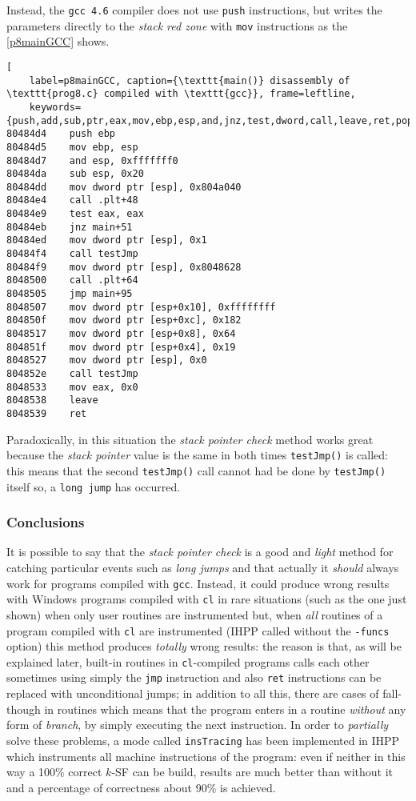 \documentclass[a4paper,10pt]{report}
\begin{document}
\noindent
Instead, the \verb|gcc 4.6| compiler does not use \verb|push| instructions, but
writes the parameters directly to the \emph{stack red zone}
with \verb|mov| instructions as the \cref{p8mainGCC} shows.

\begin{lstlisting}[
	label=p8mainGCC, caption={\texttt{main()} disassembly of \texttt{prog8.c} compiled with \texttt{gcc}}, frame=leftline,
	keywords={push,add,sub,ptr,eax,mov,ebp,esp,and,jnz,test,dword,call,leave,ret,pop,jmp}]
80484d4    push ebp
80484d5    mov ebp, esp
80484d7    and esp, 0xfffffff0
80484da    sub esp, 0x20
80484dd    mov dword ptr [esp], 0x804a040
80484e4    call .plt+48
80484e9    test eax, eax
80484eb    jnz main+51
80484ed    mov dword ptr [esp], 0x1
80484f4    call testJmp
80484f9    mov dword ptr [esp], 0x8048628
8048500    call .plt+64
8048505    jmp main+95
8048507    mov dword ptr [esp+0x10], 0xffffffff
804850f    mov dword ptr [esp+0xc], 0x182
8048517    mov dword ptr [esp+0x8], 0x64
804851f    mov dword ptr [esp+0x4], 0x19
8048527    mov dword ptr [esp], 0x0
804852e    call testJmp
8048533    mov eax, 0x0
8048538    leave
8048539    ret
\end{lstlisting}

\noindent
Paradoxically, in this situation the \emph{stack pointer check} method works
great because the \emph{stack pointer} value is the same in both times \verb|testJmp()|
is called: this means that the second \verb|testJmp()| call cannot had be done by \verb|testJmp()| itself so, a \verb|long jump| has occurred.

\subsubsection{Conclusions}
It is possible to say that the \emph{stack pointer check} is
a good and \emph{light} method for catching particular events such as \emph{long jumps}
and that actually it \emph{should} always work for programs compiled with \verb|gcc|.
Instead, it could produce wrong results with Windows programs compiled with \verb|cl|
in rare situations (such as the one just shown) when only user routines are instrumented but, when \emph{all} routines of a program compiled with \verb|cl| are instrumented (IHPP called without the \verb|-funcs| option) this method produces \emph{totally} wrong results:
the reason is that, as will be explained later, built-in routines in \verb|cl|-compiled programs calls each other sometimes using simply the \verb|jmp| instruction and also
\verb|ret| instructions can be replaced with unconditional jumps; in addition to
all this, there are cases of fall-though in routines which means that the program
enters in a routine \emph{without} any form of \emph{branch}, by simply executing
the next instruction. In order to \emph{partially} solve these problems,
a mode called \verb|insTracing| has been implemented in IHPP which instruments all machine instructions of the program: even if neither in this way a 100\% correct $k$-SF
can be build, results are much better than without it and a percentage of correctness
about 90\% is achieved.
\end{document}
